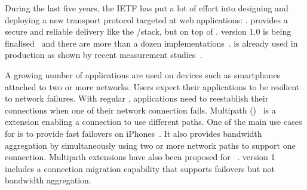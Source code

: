 During the last five years, the IETF has put a lot of effort
into designing and deploying a new transport protocol targeted at web
applications: \quic \cite{langley2017quic}. \quic provides a secure and
reliable delivery like the \tls/\tcp stack, but on top of \udp.
\quic
version 1.0 is being finalised~\cite{draft-ietf-quic-transport} and there are
more than a dozen implementations~\cite{quicimplem,marx2020same}. \quic is
already used in production as shown by recent measurement
studies~\cite{trevisan2020five}.

A growing number of applications are used on devices such as smartphones
attached to two or more networks. Users expect their applications to be
resilient to network failures.  With regular \tcp, applications need to
reestablish their connections when one of their network connection fails.
Multipath \tcp (\mptcp)~\cite{rfc8684,raiciu2012hard} is a \tcp extension
enabling a connection to use different paths. One of the main use cases for
\mptcp is to provide fast failovers on iPhones~\cite{bonaventure2016multipath}.
It also provides bandwidth aggregation by simultaneously using two or more
network paths to support one connection. Multipath extensions have also been
proposed for \quic~\cite{viernickel2018multipath,de2017multipath}. \quic version
1~\cite{draft-ietf-quic-transport} includes a connection migration capability
that supports failovers but not bandwidth aggregation.
